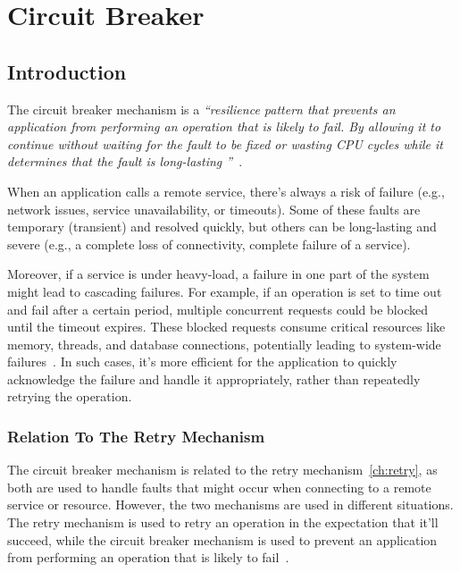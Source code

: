 \chapter{Circuit Breaker}\label{ch:circuit-breaker}



\section{Introduction}\label{sec:cbreaker-introduction}

The circuit breaker mechanism is a \textit{\enquote{resilience pattern
that prevents an application from performing an operation that is likely to fail.
By allowing it
to continue
without waiting for the fault to be fixed or wasting CPU cycles while it determines that the fault is long-lasting
}}~\cite{microsoft-cbreaker-pattern}.

When an application calls a remote service, there's always a risk of failure
(e.g., network issues, service unavailability, or timeouts).
Some of these faults are temporary (transient) and resolved quickly,
but others can be long-lasting and severe (e.g., a complete loss of connectivity, complete failure of a service).

Moreover, if a service is under heavy-load, a failure in one part of the system might lead to cascading failures.
For example, if an operation is set to time out and fail after a certain period, multiple concurrent requests could be blocked until the timeout expires.
These blocked requests consume critical resources like memory, threads, and database connections, potentially leading to system-wide failures~\cite{microsoft-cbreaker-pattern}.
In such cases, it’s more efficient for the application to quickly acknowledge the failure and handle it appropriately, rather than repeatedly retrying the operation.

\subsection{Relation To The Retry Mechanism}\label{subsec:cbreaker-relation-to-retry}

The circuit breaker mechanism is related to the retry mechanism~\ref{ch:retry}, as both are used to handle faults that might occur when connecting to a remote service or resource.
However, the two mechanisms are used in different situations.
The retry mechanism is used to retry an operation in the expectation that it'll succeed, while the circuit breaker mechanism is used to prevent an application from performing an operation that is likely to fail~\cite{microsoft-cbreaker-pattern}.

